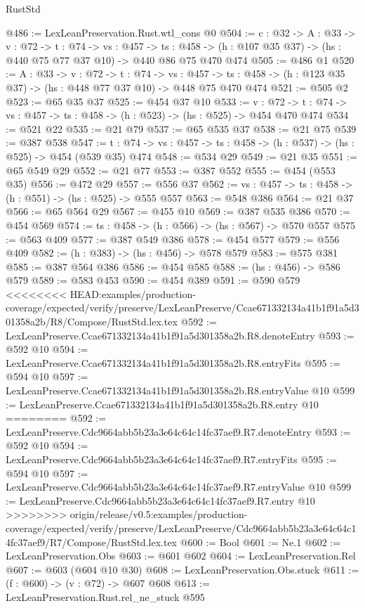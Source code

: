 \begin{lexlean}{RustStd}
\begin{coremodule}
{\begin{coremodule}
@486 := LexLeanPreservation.Rust.wtl_cons @0
@504 := {c : @32} ->
  {A : @33} ->
  {v : @72} ->
  {t : @74} ->
  {vs : @457} ->
  {ts : @458} -> (h : @107 @35 @37) -> (hs : @440 @75 @77 @37 @10) -> @440 @86 @75 @470 @474
@505 := @486 @1
@520 := {A : @33} ->
  {v : @72} ->
  {t : @74} ->
  {vs : @457} -> {ts : @458} -> (h : @123 @35 @37) -> (hs : @448 @77 @37 @10) -> @448 @75 @470 @474
@521 := @505 @2
@523 := @65 @35 @37
@525 := @454 @37 @10
@533 := {v : @72} ->
  {t : @74} -> {vs : @457} -> {ts : @458} -> (h : @523) -> (hs : @525) -> @454 @470 @474
@534 := @521 @22
@535 := @21 @79
@537 := @65 @535 @37
@538 := @21 @75
@539 := @387 @538
@547 := {t : @74} -> {vs : @457} -> {ts : @458} -> (h : @537) -> (hs : @525) -> @454 (@539 @35) @474
@548 := @534 @29
@549 := @21 @35
@551 := @65 @549 @29
@552 := @21 @77
@553 := @387 @552
@555 := @454 (@553 @35)
@556 := @472 @29
@557 := @556 @37
@562 := {vs : @457} -> {ts : @458} -> (h : @551) -> (hs : @525) -> @555 @557
@563 := @548 @386
@564 := @21 @37
@566 := @65 @564 @29
@567 := @455 @10
@569 := @387 @535 @386
@570 := @454 @569
@574 := {ts : @458} -> (h : @566) -> (hs : @567) -> @570 @557
@575 := @563 @409
@577 := @387 @549 @386
@578 := @454 @577
@579 := @556 @409
@582 := (h : @383) -> (hs : @456) -> @578 @579
@583 := @575 @381
@585 := @387 @564 @386
@586 := @454 @585
@588 := (hs : @456) -> @586 @579
@589 := @583 @453
@590 := @454 @389
@591 := @590 @579
<<<<<<<< HEAD:examples/production-coverage/expected/verify/preserve/LexLeanPreserve/Ccae671332134a41b1f91a5d301358a2b/R8/Compose/RustStd.lex.tex
@592 := LexLeanPreserve.Ccae671332134a41b1f91a5d301358a2b.R8.denoteEntry
@593 := @592 @10
@594 := LexLeanPreserve.Ccae671332134a41b1f91a5d301358a2b.R8.entryFits
@595 := @594 @10
@597 := LexLeanPreserve.Ccae671332134a41b1f91a5d301358a2b.R8.entryValue @10
@599 := LexLeanPreserve.Ccae671332134a41b1f91a5d301358a2b.R8.entry @10
========
@592 := LexLeanPreserve.Cdc9664abb5b23a3e64c64c14fc37aef9.R7.denoteEntry
@593 := @592 @10
@594 := LexLeanPreserve.Cdc9664abb5b23a3e64c64c14fc37aef9.R7.entryFits
@595 := @594 @10
@597 := LexLeanPreserve.Cdc9664abb5b23a3e64c64c14fc37aef9.R7.entryValue @10
@599 := LexLeanPreserve.Cdc9664abb5b23a3e64c64c14fc37aef9.R7.entry @10
>>>>>>>> origin/release/v0.5:examples/production-coverage/expected/verify/preserve/LexLeanPreserve/Cdc9664abb5b23a3e64c64c14fc37aef9/R7/Compose/RustStd.lex.tex
@600 := Bool
@601 := Ne.{1}
@602 := LexLeanPreservation.Obs
@603 := @601 @602
@604 := LexLeanPreservation.Rel
@607 := @603 (@604 @10 @30)
@608 := LexLeanPreservation.Obs.stuck
@611 := (f : @600) -> (v : @72) -> @607 @608
@613 := LexLeanPreservation.Rust.rel_ne_stuck @595

\end{coremodule}}
\end{coremodule}
\end{lexlean}
